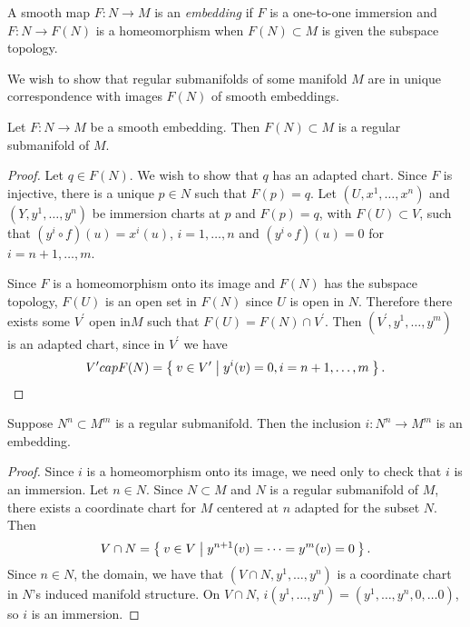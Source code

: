 \begin{defn}
A smooth map $F: N \to M$ is an \emph{embedding} if $F$ is a
one-to-one immersion and $F : N \to F(N)$ is a homeomorphism when
$F(N) \subset M$ is given the subspace topology.
\end{defn}

We wish to show that regular submanifolds of some manifold $M$ are in
unique correspondence with images $F(N)$ of smooth embeddings.

\begin{prop}
Let $F: N \to M$ be a smooth embedding. Then $F(N) \subset M$ is a
regular submanifold of $M$.
\end{prop}

\begin{proof}
Let $q \in F(N)$. We wish to show that $q$ has an adapted chart.
Since $F$ is injective, there is a unique $p \in N$ such that
$F(p) = q$. Let $(U, x^1, \dots, x^n)$ and $(Y, y^1, \dots, y^n)$ be
immersion charts at $p$ and $F(p) = q$, with $F(U) \subset V$, such that
$(y^i \circ f)(u) = x^i(u)$, $i = 1, \dots, n$
and $(y^i \circ f)(u) = 0$ for $i = n+1, \dots, m$.

Since $F$ is a homeomorphism onto its image and $F(N)$ has the
subspace topology, $F(U)$ is an open set in $F(N)$ since $U$ is open
in $N$. Therefore there exists some $V^\prime$ open in$M$ such that
$F(U) = F(N) \cap V^\prime$. Then $(V^\prime, y^1, \dots, y^m)$ is an
adapted chart, since in $V^\prime$ we have
$$
  V^\prime \\cap F(N)
= \Set{ v \in V^\prime | y^i(v) = 0, i = n+1, \dots, m }.
$$
\end{proof}

\begin{prop}
Suppose $N^n \subset M^m$ is a regular submanifold. Then the inclusion
$i : N^n \to M^m$ is an embedding.
\end{prop}

\begin{proof}
Since $i$ is a homeomorphism onto its image, we need only to check
that $i$ is an immersion. Let $n \in N$. Since $N \subset M$ and $N$ is a regular
submanifold of $M$, there exists a coordinate chart for $M$ centered
at $n$ adapted for the subset $N$. Then
$$
  V \cap N
= \Set{ v \in V | y^{n+1}(v) = \cdots = y^m(v) = 0 }.
$$
Since $n \in N$, the domain, we have that
$(V \cap N, y^1, \dots, y^n)$ is a coordinate chart in $N$'s induced
manifold structure. On $V \cap N$,
$i(y^1, \dots, y^n) = (y^1, \dots, y^n, 0, \dots 0)$, so $i$ is an immersion.
\end{proof}

